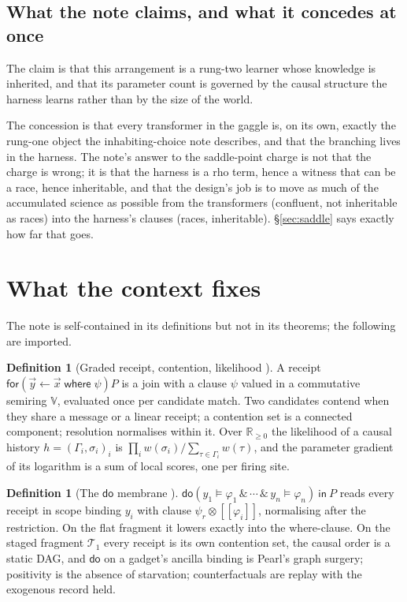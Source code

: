 \documentclass[11pt]{article}
\theoremstyle{plain}
\theoremstyle{definition}
\newtheorem{definition}[theorem]{Definition}
\theoremstyle{remark}
\newcommand{\V}{\mathbb{V}}
\newcommand{\Rnn}{\mathbb{R}_{\geq 0}}
\newcommand{\crisp}[1]{[\![#1]\!]}
\newcommand{\tensorv}{\otimes}
\newcommand{\dok}{\textsf{do}}
\newcommand{\ink}{\textsf{in}}
\newcommand{\fork}{\textsf{for}}
\newcommand{\where}{\textsf{where}}
\begin{document}
\subsection{What the note claims, and what it concedes at once}

The claim is that this arrangement is a rung-two learner whose knowledge is
inherited, and that its parameter count is governed by the causal structure
the harness learns rather than by the size of the world.

The concession is that every transformer in the gaggle is, on its own, exactly
the rung-one object the inhabiting-choice note describes, and that the
branching lives in the harness. The note's answer to the saddle-point charge
is not that the charge is wrong; it is that the harness is a rho term, hence a
witness that can be a race, hence inheritable, and that the design's job is to
move as much of the accumulated science as possible from the transformers
(confluent, not inheritable as races) into the harness's clauses (races,
inheritable). \S\ref{sec:saddle} says exactly how far that goes.

\section{What the context fixes}\label{sec:context}

The note is self-contained in its definitions but not in its theorems; the
following are imported.

\begin{definition}[Graded receipt, contention, likelihood {\cite{GradedPLN}}]
A receipt $\fork(\vec y \leftarrow \vec x \;\where\; \psi)P$ is a join with a
clause $\psi$ valued in a commutative semiring $\V$, evaluated once per
candidate match. Two candidates contend when they share a message or a linear
receipt; a contention set is a connected component; resolution normalises within
it. Over $\Rnn$ the likelihood of a causal history $h = (\Gamma_i, \sigma_i)_i$
is $\prod_i w(\sigma_i)/\sum_{\tau \in \Gamma_i} w(\tau)$, and the parameter
gradient of its logarithm is a sum of local scores, one per firing site.
\end{definition}

\begin{definition}[The $\dok$ membrane {\cite{Interventions}}]
$\dok(y_1 \models \varphi_1 \,\&\, \cdots \,\&\, y_n \models \varphi_n)\ \ink\ P$
reads every receipt in scope binding $y_i$ with clause $\psi_r \tensorv
\crisp{\varphi_i}$, normalising after the restriction. On the flat fragment it
lowers exactly into the where-clause. On the staged fragment $\mathcal{T}_1$
every receipt is its own contention set, the causal order is a static DAG, and
$\dok$ on a gadget's ancilla binding is Pearl's graph surgery; positivity is the
absence of starvation; counterfactuals are replay with the exogenous record
held.
\end{definition}
\end{document}
